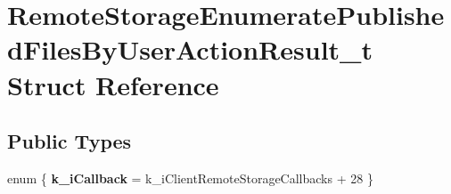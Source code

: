 \hypertarget{structRemoteStorageEnumeratePublishedFilesByUserActionResult__t}{}\section{Remote\+Storage\+Enumerate\+Published\+Files\+By\+User\+Action\+Result\+\_\+t Struct Reference}
\label{structRemoteStorageEnumeratePublishedFilesByUserActionResult__t}
\subsection*{Public Types}
\begin{DoxyCompactItemize}
\item 
\hypertarget{structRemoteStorageEnumeratePublishedFilesByUserActionResult__t_aeb07c579a1063afb1afc282199cd64d2}{}enum \{ {\bfseries k\+\_\+i\+Callback} = k\+\_\+i\+Client\+Remote\+Storage\+Callbacks + 28
 \}\label{structRemoteStorageEnumeratePublishedFilesByUserActionResult__t_aeb07c579a1063afb1afc282199cd64d2}

\end{DoxyCompactItemize}
